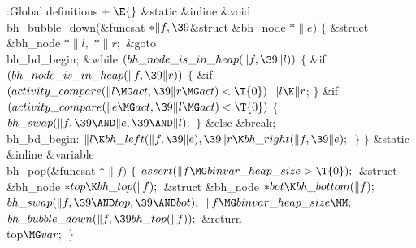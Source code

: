\Y\B\4:Global definitions\X${}\mathrel+\E{}$\6
\&{static} \&{inline} \&{void} \\{bh\_bubble\_down}(\&{funcsat} ${}{*}\|f,%
\39{}$\&{struct} \&{bh\_node} ${}{*}\|e){}$\1\1\2\2\6
${}\{{}$\1\6
\&{struct} \&{bh\_node} ${}{*}\|l,{}$ ${}{*}\|r;{}$\7
\&{goto} \\{bh\_bd\_begin};\6
\&{while} ${}(\\{bh\_node\_is\_in\_heap}(\|f,\39\|l)){}$\5
${}\{{}$\1\6
\&{if} ${}(\\{bh\_node\_is\_in\_heap}(\|f,\39\|r)){}$\5
${}\{{}$\1\6
\&{if} ${}(\\{activity\_compare}(\|l\MG\\{act},\39\|r\MG\\{act})<\T{0}){}$\1\5
${}\|l\K\|r{}$;\2\6
\4${}\}{}$\2\6
\&{if} ${}(\\{activity\_compare}(\|e\MG\\{act},\39\|l\MG\\{act})<\T{0}){}$\5
${}\{{}$\1\6
${}\\{bh\_swap}(\|f,\39{\AND}\|e,\39{\AND}\|l);{}$\6
\4${}\}{}$\2\6
\&{else}\1\5
\&{break};\2\6
\4\\{bh\_bd\_begin}:\5
${}\|l\K\\{bh\_left}(\|f,\39\|e),\39\|r\K\\{bh\_right}(\|f,\39\|e);{}$\6
\4${}\}{}$\2\6
\4${}\}{}$\2\7
\&{static} \&{inline} \&{variable} \\{bh\_pop}(\&{funcsat} ${}{*}\|f){}$\1\1\2%
\2\6
${}\{{}$\1\6
${}\\{assert}(\|f\MG\\{binvar\_heap\_size}>\T{0});{}$\7
\&{struct} \&{bh\_node} ${}{*}\\{top}\K\\{bh\_top}(\|f);{}$\6
\&{struct} \&{bh\_node} ${}{*}\\{bot}\K\\{bh\_bottom}(\|f);{}$\7
${}\\{bh\_swap}(\|f,\39{\AND}\\{top},\39{\AND}\\{bot});{}$\6
${}\|f\MG\\{binvar\_heap\_size}\MM;{}$\6
${}\\{bh\_bubble\_down}(\|f,\39\\{bh\_top}(\|f));{}$\6
\&{return} \\{top}${}\MG\\{var};{}$\6
\4${}\}{}$\2\par
\fi

